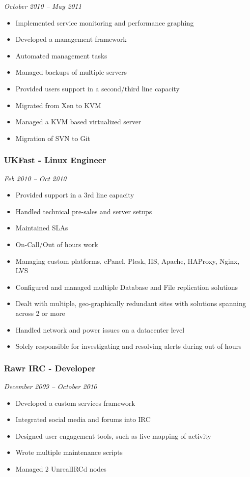 \emph{October 2010 -- May 2011}

\begin{itemize}
\item
  Implemented service monitoring and performance graphing
\item
  Developed a management framework
\item
  Automated management tasks
\item
  Managed backups of multiple servers
\item
  Provided users support in a second/third line capacity
\item
  Migrated from Xen to KVM
\item
  Managed a KVM based virtualized server
\item
  Migration of SVN to Git
\end{itemize}
\subsubsection{UKFast - Linux Engineer}

\emph{Feb 2010 -- Oct 2010}

\begin{itemize}
\item
  Provided support in a 3rd line capacity
\item
  Handled technical pre-sales and server setups
\item
  Maintained SLAs
\item
  On-Call/Out of hours work
\item
  Managing custom platforms, cPanel, Plesk, IIS, Apache, HAProxy, Nginx,
  LVS
\item
  Configured and managed multiple Database and File replication
  solutions
\item
  Dealt with multiple, geo-graphically redundant sites with solutions
  spanning across 2 or more
\item
  Handled network and power issues on a datacenter level
\item
  Solely responsible for investigating and resolving alerts during out
  of hours
\end{itemize}
\subsubsection{Rawr IRC - Developer}

\emph{December 2009 -- October 2010}

\begin{itemize}
\item
  Developed a custom services framework
\item
  Integrated social media and forums into IRC
\item
  Designed user engagement tools, such as live mapping of activity
\item
  Wrote multiple maintenance scripts
\item
  Managed 2 UnrealIRCd nodes
\end{itemize}
